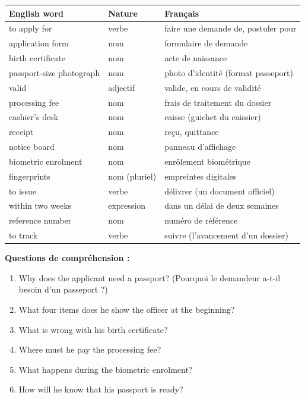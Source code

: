 \documentclass[11pt]{article}
\begin{document}
\begin{center}
\begin{tabularx}{\linewidth}{|l|l|X|}
\hline
\rowcolor{popblueL} \textbf{English word} & \textbf{Nature} & \textbf{Français} \\
\hline
to apply for & verbe & faire une demande de, postuler pour \\
\hline
application form & nom & formulaire de demande \\
\hline
birth certificate & nom & acte de naissance \\
\hline
passport-size photograph & nom & photo d'identité (format passeport) \\
\hline
valid & adjectif & valide, en cours de validité \\
\hline
processing fee & nom & frais de traitement du dossier \\
\hline
cashier's desk & nom & caisse (guichet du caissier) \\
\hline
receipt & nom & reçu, quittance \\
\hline
notice board & nom & panneau d'affichage \\
\hline
biometric enrolment & nom & enrôlement biométrique \\
\hline
fingerprints & nom (pluriel) & empreintes digitales \\
\hline
to issue & verbe & délivrer (un document officiel) \\
\hline
within two weeks & expression & dans un délai de deux semaines \\
\hline
reference number & nom & numéro de référence \\
\hline
to track & verbe & suivre (l'avancement d'un dossier) \\
\hline
\end{tabularx}
\end{center}

\textbf{Questions de compréhension :}
\begin{enumerate}
\item Why does the applicant need a passport? (Pourquoi le demandeur a-t-il besoin d'un passeport ?)
\item What four items does he show the officer at the beginning?
\item What is wrong with his birth certificate?
\item Where must he pay the processing fee?
\item What happens during the biometric enrolment?
\item How will he know that his passport is ready?
\end{enumerate}
\end{document}
